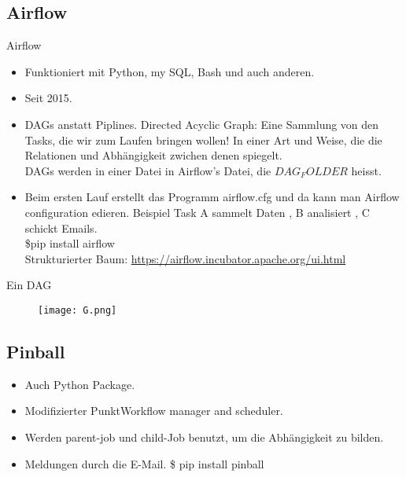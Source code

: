 \documentclass[t]{beamer}       %
\begin{document}
\subsection{Airflow}
\begin{frame}{Airflow}
\begin{itemize}
\item Funktioniert mit Python, my SQL, Bash und auch anderen.\\
\item Seit 2015.
\item DAGs anstatt Piplines.
Directed Acyclic Graph:
Eine Sammlung von den Tasks, die wir zum Laufen bringen wollen!
In einer Art und Weise, die die Relationen und Abhängigkeit zwichen denen spiegelt.\\
DAGs werden in einer Datei in Airflow's Datei, die $ DAG_FOLDER$ heisst.
\item Beim ersten Lauf erstellt das Programm  airflow.cfg und da kann man Airflow configuration edieren.
Beispiel Task A sammelt Daten , B analisiert , C schickt Emails.\\
\$pip install airflow\\
Strukturierter Baum:
\url{https://airflow.incubator.apache.org/ui.html}
\end{itemize}
\end{frame}


\begin{frame}{Ein DAG}
\begin{figure}
\texttt{[image: G.png]}
\end{figure}
\end{frame}

\subsection{Pinball}


\begin{frame}
\begin{itemize}
\item Auch Python Package.
\item Modifizierter PunktWorkflow manager and scheduler.
\item Werden parent-job und child-Job benutzt, um die Abhängigkeit zu bilden.
\item Meldungen durch die E-Mail.
\$ pip install pinball
\end{itemize}
\end{frame}
\end{document}
